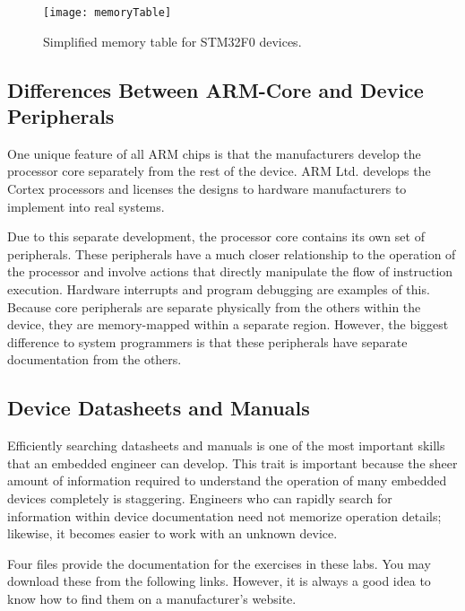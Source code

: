 \documentclass[11pt,fleqn]{book} %
\begin{document}
\begin{figure}[]
    \centering\texttt{[image: memoryTable]}
    \caption{Simplified memory table for STM32F0 devices.}
    \label{memoryTable}
\end{figure}


\subsection{Differences Between ARM-Core and Device Peripherals}

One unique feature of all ARM chips is that the manufacturers develop the processor core separately from the rest of the device. ARM Ltd. develops the Cortex processors and licenses the designs to hardware manufacturers to implement into real systems. 

Due to this separate development, the processor core contains its own set of peripherals. These peripherals have a much closer relationship to the operation of the processor and involve actions that directly manipulate the flow of instruction execution. Hardware interrupts and program debugging are examples of this. Because core peripherals are separate physically from the others within the device, they are memory-mapped within a separate region. However, the biggest difference to system programmers is that these peripherals have separate documentation from the others.


\subsection{Device Datasheets and Manuals}

Efficiently searching datasheets and manuals is one of the most important skills that an embedded engineer can develop. This trait is important because the sheer amount of information required to understand the operation of many embedded devices completely is staggering. 
Engineers who can rapidly search for information within device documentation need not memorize operation details; likewise, it becomes easier to work with an unknown device. 

Four files provide the documentation for the exercises in these labs. You may download these from the following links. However, it is always a good idea to know how to find them on a manufacturer's website.
\end{document}
